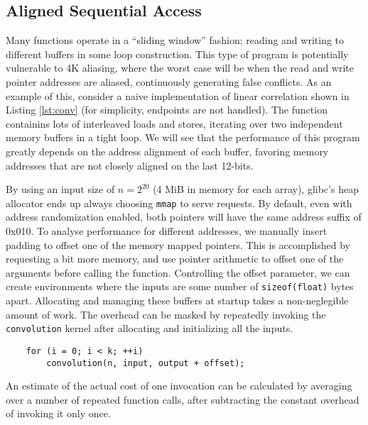 \documentclass[prodmode,acmtaco]{acmsmall}
\begin{document}
{\subsection{Aligned Sequential Access}
Many functions operate in a ``sliding window'' fashion; reading and writing to different buffers in some loop construction.
This type of program is potentially vulnerable to 4K aliasing, where the worst case will be when the read and write pointer addresses are aliased, continuously generating false conflicts.
As an example of this, consider a naive implementation of linear correlation shown in Listing \ref{lst:conv} (for simplicity, endpoints are not handled).
The function containins lots of interleaved loads and stores, iterating over two independent memory buffers in a tight loop.
We will see that the performance of this program greatly depends on the address alignment of each buffer, favoring memory addresses that are not closely aligned on the last 12-bits.



By using an input size of $n=2^{20}$ (4 MiB in memory for each array), glibc's heap allocator ends up always choosing \texttt{mmap} to serve requests.
By default, even with address randomization enabled, both pointers will have the same address suffix of 0x010.
To analyse performance for different addresses, we manually insert padding to offset one of the memory mapped pointers.
This is accomplished by requesting a bit more memory, and use pointer arithmetic to offset one of the arguments before calling the function.
Controlling the offset parameter, we can create environments where the inputs are some number of \texttt{sizeof(float)} bytes apart.
Allocating and managing these buffers at startup takes a non-neglegible amount of work.
The overhead can be masked by repeatedly invoking the \texttt{convolution} kernel after allocating and initializing all the inputs.
\begin{lstlisting}
    for (i = 0; i < k; ++i)
        convolution(n, input, output + offset);
\end{lstlisting}
An estimate of the actual cost of one invocation can be calculated by averaging over a number of repeated function calls, after subtracting the constant overhead of invoking it only once.

}
\end{document}
